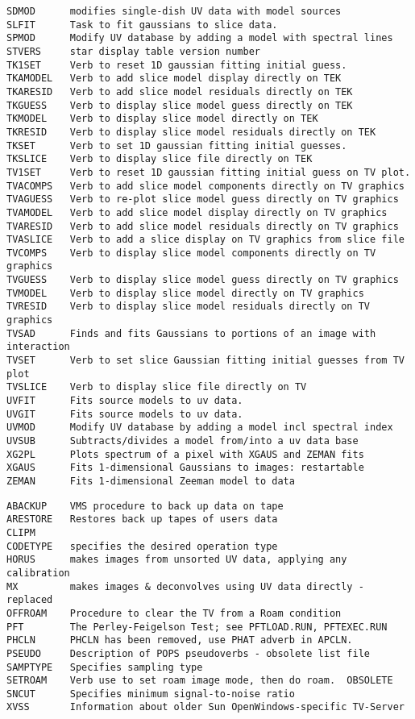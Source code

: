 \begin{verbatim}
SDMOD      modifies single-dish UV data with model sources
SLFIT      Task to fit gaussians to slice data.
SPMOD      Modify UV database by adding a model with spectral lines
STVERS     star display table version number
TK1SET     Verb to reset 1D gaussian fitting initial guess.
TKAMODEL   Verb to add slice model display directly on TEK
TKARESID   Verb to add slice model residuals directly on TEK
TKGUESS    Verb to display slice model guess directly on TEK
TKMODEL    Verb to display slice model directly on TEK
TKRESID    Verb to display slice model residuals directly on TEK
TKSET      Verb to set 1D gaussian fitting initial guesses.
TKSLICE    Verb to display slice file directly on TEK
TV1SET     Verb to reset 1D gaussian fitting initial guess on TV plot.
TVACOMPS   Verb to add slice model components directly on TV graphics
TVAGUESS   Verb to re-plot slice model guess directly on TV graphics
TVAMODEL   Verb to add slice model display directly on TV graphics
TVARESID   Verb to add slice model residuals directly on TV graphics
TVASLICE   Verb to add a slice display on TV graphics from slice file
TVCOMPS    Verb to display slice model components directly on TV graphics
TVGUESS    Verb to display slice model guess directly on TV graphics
TVMODEL    Verb to display slice model directly on TV graphics
TVRESID    Verb to display slice model residuals directly on TV graphics
TVSAD      Finds and fits Gaussians to portions of an image with interaction
TVSET      Verb to set slice Gaussian fitting initial guesses from TV plot
TVSLICE    Verb to display slice file directly on TV
UVFIT      Fits source models to uv data.
UVGIT      Fits source models to uv data.
UVMOD      Modify UV database by adding a model incl spectral index
UVSUB      Subtracts/divides a model from/into a uv data base
XG2PL      Plots spectrum of a pixel with XGAUS and ZEMAN fits
XGAUS      Fits 1-dimensional Gaussians to images: restartable
ZEMAN      Fits 1-dimensional Zeeman model to data
\end{verbatim}\eve


\vskip 0.5pt
\bbve\begin{verbatim}
ABACKUP    VMS procedure to back up data on tape
ARESTORE   Restores back up tapes of users data
CLIPM
CODETYPE   specifies the desired operation type
HORUS      makes images from unsorted UV data, applying any calibration
MX         makes images & deconvolves using UV data directly - replaced
OFFROAM    Procedure to clear the TV from a Roam condition
PFT        The Perley-Feigelson Test; see PFTLOAD.RUN, PFTEXEC.RUN
PHCLN      PHCLN has been removed, use PHAT adverb in APCLN.
PSEUDO     Description of POPS pseudoverbs - obsolete list file
SAMPTYPE   Specifies sampling type
SETROAM    Verb use to set roam image mode, then do roam.  OBSOLETE
SNCUT      Specifies minimum signal-to-noise ratio
XVSS       Information about older Sun OpenWindows-specific TV-Server
\end{verbatim}\eve

